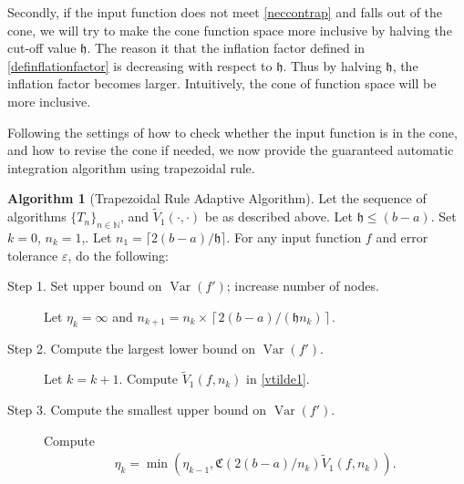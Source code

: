\documentclass{iitthesis}
\DeclareMathOperator{\Var}{Var}
\theoremstyle{definition}
\newtheorem{algo}{Algorithm}
\theoremstyle{remark}
\begin{document}
Secondly, if the input function does not meet \eqref{neccontrap} and falls out of the cone, we will try to make the cone function space more inclusive by halving the cut-off value $\mathfrak{h}$. The reason it that the inflation factor defined in \eqref{definflationfactor} is decreasing with respect to $\mathfrak{h}$. Thus by halving $\mathfrak{h}$, the inflation factor becomes larger. Intuitively, the cone of function space will be more inclusive.

Following the settings of how to check whether the input function is in the cone, and how to revise the cone if needed, we now provide the guaranteed automatic integration algorithm using trapezoidal rule.
\begin{algo}[Trapezoidal Rule Adaptive Algorithm] \label{multistagetrapalgo}
Let the sequence of algorithms $\{T_n\}_{n\in \mathbb{N}}$, %
and $\widetilde{V}_1(\cdot,\cdot)$ be as described above.
Let $\mathfrak{h}\le (b-a)$. Set $k=0$, $n_{k}=1$,. Let $n_1=\lceil2(b-a)/\mathfrak{h}\rceil$. For any input function $f$ and error tolerance $\varepsilon$, do the following: %
\begin{description}
\item[Step 1. Set upper bound on $\Var(f')$; increase number of nodes.] Let $\eta_{k}=\infty$ and $n_{k+1}=n_k\times\left\lceil2(b-a)/(\mathfrak{h}n_{k})\right\rceil$.

\item[Step 2. Compute the largest lower bound on {$\Var(f')$}.] Let $k=k+1$. Compute  $\widetilde{V}_1(f,n_k)$ in \eqref{vtilde1}.%

\item[Step 3. Compute the smallest upper bound on {$\Var(f')$}.] Compute
    \begin{align*}
        \eta_{k}=\min\left(\eta_{k-1},\mathfrak{C}(2(b-a)/n_{k})\widetilde{V}_1(f,n_k)\right).
    \end{align*}


\end{description}
\end{algo}
\end{document}
